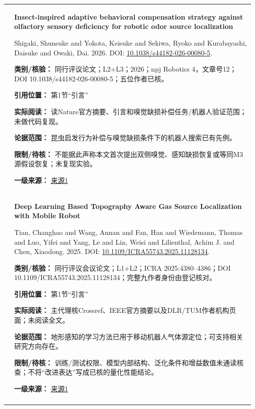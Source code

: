 \begin{longtable}{@{}>{\raggedright\arraybackslash}p{0.7cm}>{\raggedright\arraybackslash}p{14.8cm}@{}}
7 & \textbf{Insect-inspired adaptive behavioral compensation strategy against olfactory sensory deficiency for robotic odor source localization}\par Shigaki, Shunsuke and Yokota, Keisuke and Sekiwa, Ryoko and Kurabayashi, Daisuke and Owaki, Dai. 2026. DOI: \url{10.1038/s44182-026-00080-5}. \par\textbf{类别/核验：} 同行评议论文；L2+L3；2026；npj Robotics 4，文章号12；DOI 10.1038/s44182-026-00080-5；五位作者已核。\par\textbf{引用位置：} 第1节“引言”\par\textbf{实际阅读：} 读Nature官方摘要、引言和嗅觉缺损补偿任务/机器人验证范围；未做代码复现。\par\textbf{论据范围：} 昆虫启发行为补偿与嗅觉缺损条件下的机器人搜索已有先例。\par\textbf{限制/待核：} 不能据此声称本文首次提出双侧嗅觉、感知缺损恢复或等同M3源假设恢复；未复现实验。\par\textbf{一级来源：} \href{https://www.nature.com/articles/s44182-026-00080-5}{来源1} \\\addlinespace[6pt]
8 & \textbf{Deep Learning Based Topography Aware Gas Source Localization with Mobile Robot}\par Tian, Changhao and Wang, Annan and Fan, Han and Wiedemann, Thomas and Luo, Yifei and Yang, Le and Lin, Weisi and Lilienthal, Achim J. and Chen, Xiaodong. 2025. DOI: \url{10.1109/ICRA55743.2025.11128134}. \par\textbf{类别/核验：} 同行评议会议论文；L1+L2；ICRA 2025:4380–4386；DOI 10.1109/ICRA55743.2025.11128134；完整九作者身份由登记核对。\par\textbf{引用位置：} 第1节“引言”\par\textbf{实际阅读：} 主代理核Crossref、IEEE官方摘要以及DLR/TUM作者机构页面；未阅读全文。\par\textbf{论据范围：} 地形感知的学习方法已用于移动机器人气体源定位；可支持相关研究方向存在。\par\textbf{限制/待核：} 训练/测试权限、模型内部结构、泛化条件和增益数值未通读核查；不将“改进表达”写成已核的量化性能结论。\par\textbf{一级来源：} \href{https://ieeexplore.ieee.org/document/11128134/}{来源1} \\\addlinespace[6pt]

\end{longtable}
